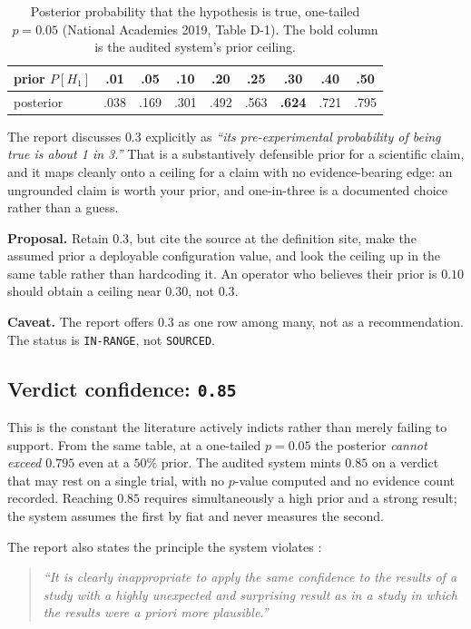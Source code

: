 \documentclass[11pt,letterpaper]{article}
\newcommand{\code}[1]{\texttt{#1}}
\begin{document}
\begin{table}[h]
\centering
\caption{Posterior probability that the hypothesis is true, one-tailed
$p = 0.05$ (National Academies 2019, Table D-1). The bold column is the
audited system's prior ceiling.}
\label{tab:nap}
\footnotesize
\setlength{\tabcolsep}{4pt}
\begin{tabular}{@{}l*{8}{c}@{}}
\toprule
prior $P[H_1]$ & .01 & .05 & .10 & .20 & .25 & \textbf{.30} & .40 & .50 \\
\midrule
posterior & .038 & .169 & .301 & .492 & .563 & \textbf{.624} & .721 & .795 \\
\bottomrule
\end{tabular}
\end{table}

The report discusses $0.3$ explicitly as \emph{``its pre-experimental probability
of being true is about 1 in 3.''} That is a substantively defensible prior for a
scientific claim, and it maps cleanly onto a ceiling for a claim with no
evidence-bearing edge: an ungrounded claim is worth your prior, and one-in-three
is a documented choice rather than a guess.

\textbf{Proposal.} Retain $0.3$, but cite the source at the definition site,
make the assumed prior a deployable configuration value, and look the ceiling up
in the same table rather than hardcoding it. An operator who believes their prior
is $0.10$ should obtain a ceiling near $0.30$, not $0.3$.

\textbf{Caveat.} The report offers $0.3$ as one row among many, not as a
recommendation. The status is \code{IN-RANGE}, not \code{SOURCED}.

\subsection{Verdict confidence: \code{0.85}}

This is the constant the literature actively indicts rather than merely failing
to support. From the same table, at a one-tailed $p = 0.05$ the posterior
\emph{cannot exceed $0.795$} even at a $50\%$ prior. The audited system mints
$0.85$ on a verdict that may rest on a single trial, with no $p$-value computed
and no evidence count recorded. Reaching $0.85$ requires simultaneously a high
prior and a strong result; the system assumes the first by fiat and never measures
the second.

The report also states the principle the system violates \cite{nap2019}:

\begin{quote}\small
\emph{``It is clearly inappropriate to apply the same confidence to the results
of a study with a highly unexpected and surprising result as in a study in which
the results were a priori more plausible.''}
\end{quote}
\end{document}
